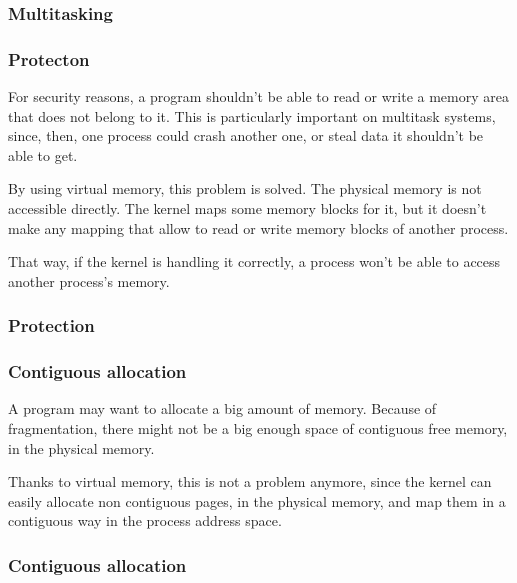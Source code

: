 \begin{frame}
  \frametitle{Multitasking}

  \begin{center}
  \end{center}

\end{frame}

\begin{frame}
  \frametitle{Protecton}

  For security reasons, a program shouldn't be able to read or write a memory area that does not belong to it. This is particularly important on multitask systems, since, then, one process could crash another one, or steal data it shouldn't be able to get.

  \-

  By using virtual memory, this problem is solved. The physical memory is not accessible directly. The kernel maps some memory blocks for it, but it doesn't make any mapping that allow to read or write memory blocks of another process.

  \-

  That way, if the kernel is handling it correctly, a process won't be able to access another process's memory.

\end{frame}

\begin{frame}
  \frametitle{Protection}

  \begin{center}
  \end{center}

\end{frame}

\begin{frame}
  \frametitle{Contiguous allocation}

  A program may want to allocate a big amount of memory. Because of fragmentation, there might not be a big enough space of contiguous free memory, in the physical memory.

  \-

  Thanks to virtual memory, this is not a problem anymore, since the kernel can easily allocate non contiguous pages, in the physical memory, and map them in a contiguous way in the process address space.

\end{frame}

\begin{frame}
  \frametitle{Contiguous allocation}

  \begin{center}
  \end{center}

\end{frame}

